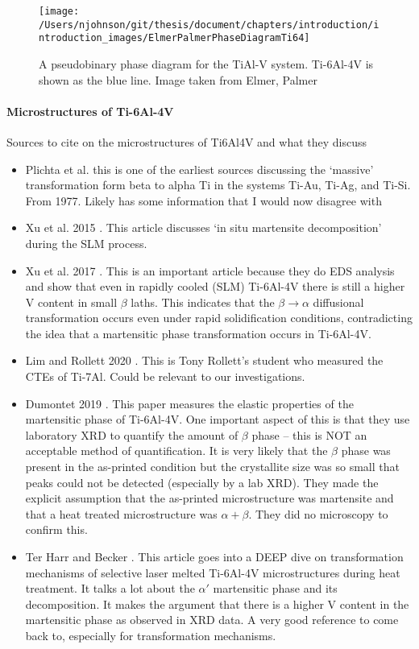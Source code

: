 \begin{figure}
	\texttt{[image: /Users/njohnson/git/thesis/document/chapters/introduction/introduction\_images/ElmerPalmerPhaseDiagramTi64]}
	\caption{A pseudobinary phase diagram for the TiAl-V system. Ti-6Al-4V is shown as the blue line. Image taken from Elmer, Palmer \cite{Elmer2005}}
	\label{Ti64phasediagram}
\end{figure}

\paragraph{Microstructures of Ti-6Al-4V}
Sources to cite on the microstructures of Ti6Al4V and what they discuss
\begin{itemize}
	\item Plichta et al. \cite{Plichta1977} this is one of the earliest sources discussing the `massive' transformation form beta to alpha Ti in the systems Ti-Au, Ti-Ag, and Ti-Si. From 1977. Likely has some information that I would now disagree with
	\item Xu et al. 2015 \cite{Xu2015}. This article discusses `in situ martensite decomposition' during the SLM process. 
	\item Xu et al. 2017 \cite{Xu2017}. This is an important article because they do EDS analysis and show that even in rapidly cooled (SLM) Ti-6Al-4V there is still a higher V content in small $\beta$ laths. This indicates that the $\beta \to \alpha$ diffusional transformation occurs even under rapid solidification conditions, contradicting the idea that a martensitic phase transformation occurs in Ti-6Al-4V.
	\item Lim and Rollett 2020 \cite{Lim2020}. This is Tony Rollett's student who measured the CTEs of Ti-7Al. Could be relevant to our investigations.
	\item Dumontet 2019 \cite{Dumontet2019}. This paper measures the elastic properties of the martensitic phase of Ti-6Al-4V. One important aspect of this is that they use laboratory XRD to quantify the amount of $\beta$ phase -- this is NOT an acceptable method of quantification. It is very likely that the $\beta$ phase was present in the as-printed condition but the crystallite size was so small that peaks could not be detected (especially by a lab XRD). They made the explicit assumption that the as-printed microstructure was martensite and that a heat treated microstructure was $\alpha + \beta$. They did no microscopy to confirm this.
	\item Ter Harr and Becker \cite{TerHarr2018}. This article goes into a DEEP dive on transformation mechanisms of selective laser melted Ti-6Al-4V microstructures during heat treatment. It talks a lot about the $\alpha'$ martensitic phase and its decomposition. It makes the argument that there is a higher V content in the martensitic phase as observed in XRD data. A very good reference to come back to, especially for transformation mechanisms.

\end{itemize}
